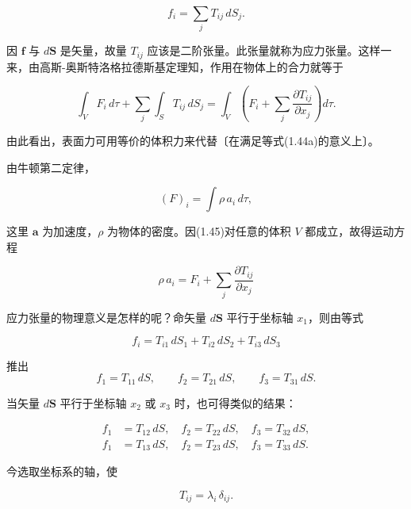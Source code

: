 \documentclass[11pt,a4paper,oneside]{ctexbook}
\newcommand{\ve}[1]{\bm{#1}}
\begin{document}
\begin{equation*}
f_i = \sum_{j} T_{ij}\, dS_j.
\end{equation*}

因 $\ve{f}$ 与 $d\ve{S}$ 是矢量，故量 $T_{ij}$ 应该是二阶张量。此张量就称为应力张量。这样一来，由高斯-奥斯特洛格拉德斯基定理知，作用在物体上的合力就等于

\begin{equation}
\int_{V} F_i\, d\tau + \sum_{j} \int_{S} T_{ij}\, dS_j = \int_{V} \left(F_i + \sum_{j} \frac{\partial T_{ij}}{\partial x_j}\right) d\tau.
\tag{1.44a}
\end{equation}

由此看出，表面力可用等价的体积力来代替〔在满足等式(1.44a)的意义上〕。

由牛顿第二定律，

\begin{equation}
(F)_i = \int \rho\, a_i\, d\tau,
\tag{1.45}
\end{equation}

这里 $\ve{a}$ 为加速度，$\rho$ 为物体的密度。因(1.45)对任意的体积 $V$ 都成立，故得运动方程

\begin{equation}
\rho\, a_i = F_i + \sum_{j} \frac{\partial T_{ij}}{\partial x_j}
\tag{1.46}
\end{equation}

应力张量的物理意义是怎样的呢？命矢量 $d\ve{S}$ 平行于坐标轴 $x_1$，则由等式

\begin{equation*}
f_i = T_{i1}\, dS_1 + T_{i2}\, dS_2 + T_{i3}\, dS_3
\end{equation*}

推出
\begin{equation*}
f_1 = T_{11}\, dS, \qquad f_2 = T_{21}\, dS, \qquad f_3 = T_{31}\, dS.
\end{equation*}

当矢量 $d\ve{S}$ 平行于坐标轴 $x_2$ 或 $x_3$ 时，也可得类似的结果：

\begin{equation*}
\begin{aligned}
f_1 &= T_{12}\, dS, \quad f_2 = T_{22}\, dS, \quad f_3 = T_{32}\, dS,\\
f_1 &= T_{13}\, dS, \quad f_2 = T_{23}\, dS, \quad f_3 = T_{33}\, dS.
\end{aligned}
\end{equation*}

今选取坐标系的轴，使

\begin{equation*}
T_{ij} = \lambda_i\, \delta_{ij}.
\end{equation*}
\end{document}
